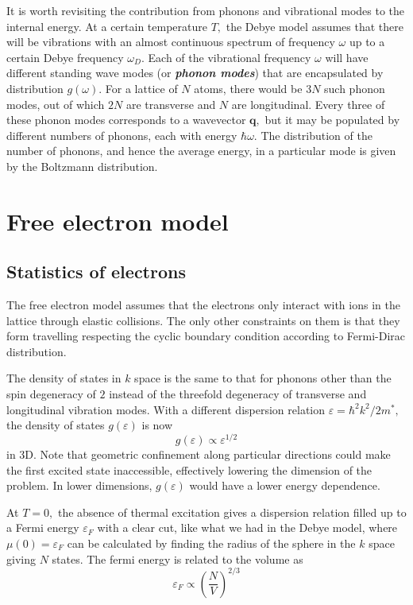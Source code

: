 \documentclass{article}
\theoremstyle{nonumberplain}
\begin{document}
It is worth revisiting the contribution from phonons and vibrational modes to the internal energy. At a certain temperature $T,$ the Debye model assumes that there will be vibrations with an almost continuous spectrum of frequency $\omega$ up to a certain Debye frequency $\omega_D.$ Each of the vibrational frequency $\omega$ will have different standing wave modes (or \textit{\textbf{phonon modes}}) that are encapsulated by distribution $g(\omega).$ For a lattice of $N$ atoms, there would be $3N$ such phonon modes, out of which $2N$ are transverse and $N$ are longitudinal. Every three of these phonon modes corresponds to a wavevector $\mathbf{q},$ but it may be populated by different numbers of phonons, each with energy $\hbar \omega$. The distribution of the number of phonons, and hence the average energy, in a particular mode is given by the Boltzmann distribution. 
\section{Free electron model}
\subsection{Statistics of electrons}
The free electron model assumes that the electrons only interact with ions in the lattice through elastic collisions. The only other constraints on them is that they form travelling respecting the cyclic boundary condition according to Fermi-Dirac distribution. 

The density of states in $k$ space is the same to that for phonons other than the spin degeneracy of $2$ instead of the threefold degeneracy of transverse and longitudinal vibration modes. With a different dispersion relation 
\(
    \varepsilon = \hbar ^{2} k^{2}  / 2 m^{*},
\) 
the density of states $g(\varepsilon)$ is now
\[
    g(\varepsilon ) \propto \varepsilon^{1 /2}
\]
in 3D. Note that geometric confinement along particular directions could make the first excited state inaccessible, effectively lowering the dimension of the problem. In lower dimensions, $g(\varepsilon)$ would have a lower energy dependence. 

At $T = 0,$ the absence of thermal excitation gives a dispersion relation filled up to a Fermi energy $\varepsilon_F$ with a clear cut, like what we had in the Debye model, where $\mu(0) = \varepsilon_F$ can be calculated by finding the radius of the sphere in the $k$ space giving $N$ states. The fermi energy is related to the volume as
\[
    \boxed{\varepsilon_{F} \propto \left(\frac{N}{V}\right)^{2 / 3}}
\]
\end{document}
